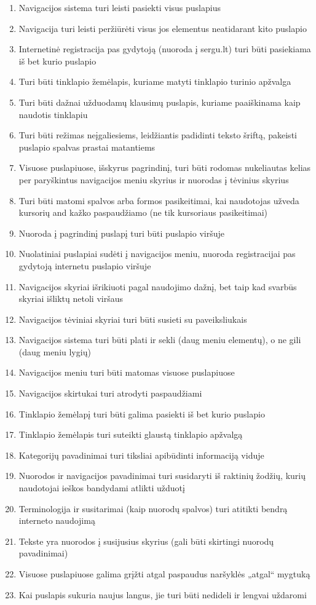 \documentclass{VUMIFPSkursinis}
\begin{document}
\begin{enumerate}
	\item Navigacijos sistema turi leisti pasiekti visus puslapius
	\item Navigacija turi leisti peržiūrėti visus jos elementus neatidarant kito puslapio
	\item Internetinė registracija pas gydytoją (nuoroda į sergu.lt) turi būti pasiekiama iš bet kurio puslapio
	\item Turi būti tinklapio žemėlapis, kuriame matyti tinklapio turinio apžvalga
	\item Turi būti dažnai užduodamų klausimų puslapis, kuriame paaiškinama kaip naudotis tinklapiu
	\item Turi būti režimas neįgaliesiems, leidžiantis padidinti teksto šriftą, pakeisti puslapio spalvas prastai matantiems
	\item Visuose puslapiuose, išskyrus pagrindinį, turi būti rodomas nukeliautas kelias per paryškintus navigacijos meniu skyrius ir nuorodas į tėvinius skyrius
	\item Turi būti matomi spalvos arba formos pasikeitimai, kai naudotojas užveda kursorių and kažko paspaudžiamo (ne tik kursoriaus pasikeitimai)
	\item Nuoroda į pagrindinį puslapį turi būti puslapio viršuje
	\item Nuolatiniai puslapiai sudėti į navigacijos meniu, nuoroda registracijai pas gydytoją internetu puslapio viršuje
	\item Navigacijos skyriai išrikiuoti pagal naudojimo dažnį, bet taip kad svarbūs skyriai išliktų netoli viršaus
	\item Navigacijos tėviniai skyriai turi būti susieti su paveiksliukais
	\item Navigacijos sistema turi būti plati ir sekli (daug meniu elementų), o ne gili (daug meniu lygių)
	\item Navigacijos meniu turi būti matomas visuose puslapiuose
	\item Navigacijos skirtukai turi atrodyti paspaudžiami
	\item Tinklapio žemėlapį turi būti galima pasiekti iš bet kurio puslapio
	\item Tinklapio žemėlapis turi suteikti glaustą tinklapio apžvalgą
	\item Kategorijų pavadinimai turi tiksliai apibūdinti informaciją viduje
	\item Nuorodos ir navigacijos pavadinimai turi susidaryti iš raktinių žodžių, kurių naudotojai ieškos bandydami atlikti užduotį
	\item Terminologija ir susitarimai (kaip nuorodų spalvos) turi atitikti bendrą interneto naudojimą
	\item Tekste yra nuorodos į susijusius skyrius (gali būti skirtingi nuorodų pavadinimai)
	\item Visuose puslapiuose galima grįžti atgal paspaudus naršyklės „atgal“ mygtuką
	\item Kai puslapis sukuria naujus langus, jie turi būti nedideli ir lengvai uždaromi
\end{enumerate}
\end{document}
